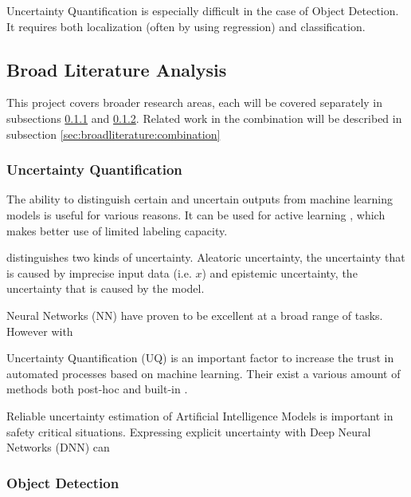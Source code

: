 Uncertainty Quantification is especially difficult in the case of Object Detection. It requires both localization (often by using regression) and classification.

\subsection{Broad Literature Analysis}\label{sec:broadliterature}

This project covers broader research areas, each will be covered separately in subsections \ref{sec:broadliterature:uncertainty} and \ref{sec:broadliterature:object_detection}. Related work in the combination will be described in subsection \ref{sec:broadliterature:combination}

\subsubsection{Uncertainty Quantification}\label{sec:broadliterature:uncertainty}
The ability to distinguish certain and uncertain outputs from machine learning models is useful for various reasons. It can be used for active learning \cite{yang2009effective, settles2009active, Bernhardt_2022}, which makes better use of limited labeling capacity.

\citep{gal2016uncertainty} distinguishes two kinds of uncertainty. Aleatoric uncertainty, the uncertainty that is caused by imprecise input data (i.e. $x$) and epistemic uncertainty, the uncertainty that is caused by the model.

Neural Networks (NN) have proven to be excellent at a broad range of tasks. However with

Uncertainty Quantification (UQ) is an important factor to increase the trust in automated processes based on machine learning. Their exist a various amount of methods both post-hoc  and built-in .



Reliable uncertainty estimation of Artificial Intelligence Models is important in safety critical situations. Expressing explicit uncertainty with Deep Neural Networks (DNN) can

\subsubsection{Object Detection}\label{sec:broadliterature:object_detection}

